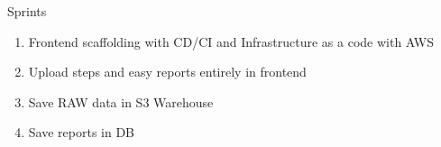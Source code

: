 
Sprints

\begin{enumerate}
    \item Frontend scaffolding with CD/CI and Infrastructure as a code with AWS
    \item Upload steps and easy reports entirely in frontend
    \item Save RAW data in S3 Warehouse
    \item Save reports in DB
\end{enumerate}
